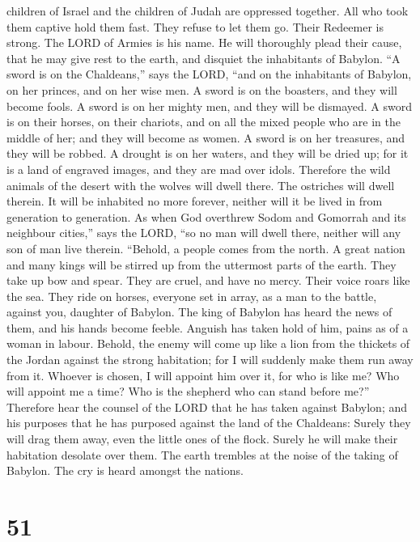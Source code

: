 children of Israel and the children of Judah are oppressed together. All
who took them captive hold them fast. They refuse to let them go.
 Their Redeemer is strong. The LORD of Armies is his
name. He will thoroughly plead their cause, that he may give rest to the
earth, and disquiet the inhabitants of Babylon.  ``A
sword is on the Chaldeans,'' says the LORD, ``and on the inhabitants of
Babylon, on her princes, and on her wise men.  A sword is
on the boasters, and they will become fools. A sword is on her mighty
men, and they will be dismayed.  A sword is on their
horses, on their chariots, and on all the mixed people who are in the
middle of her; and they will become as women. A sword is on her
treasures, and they will be robbed.  A drought is on her
waters, and they will be dried up; for it is a land of engraved images,
and they are mad over idols.  Therefore the wild animals
of the desert with the wolves will dwell there. The ostriches will dwell
therein. It will be inhabited no more forever, neither will it be lived
in from generation to generation.  As when God overthrew
Sodom and Gomorrah and its neighbour cities,'' says the LORD, ``so no
man will dwell there, neither will any son of man live therein.
 ``Behold, a people comes from the north. A great nation
and many kings will be stirred up from the uttermost parts of the earth.
 They take up bow and spear. They are cruel, and have no
mercy. Their voice roars like the sea. They ride on horses, everyone set
in array, as a man to the battle, against you, daughter of Babylon.
 The king of Babylon has heard the news of them, and his
hands become feeble. Anguish has taken hold of him, pains as of a woman
in labour.  Behold, the enemy will come up like a lion
from the thickets of the Jordan against the strong habitation; for I
will suddenly make them run away from it. Whoever is chosen, I will
appoint him over it, for who is like me? Who will appoint me a time? Who
is the shepherd who can stand before me?''  Therefore
hear the counsel of the LORD that he has taken against Babylon; and his
purposes that he has purposed against the land of the Chaldeans: Surely
they will drag them away, even the little ones of the flock. Surely he
will make their habitation desolate over them.  The earth
trembles at the noise of the taking of Babylon. The cry is heard amongst
the nations.

\hypertarget{section-50}{%
\section{51}\label{section-50}}


